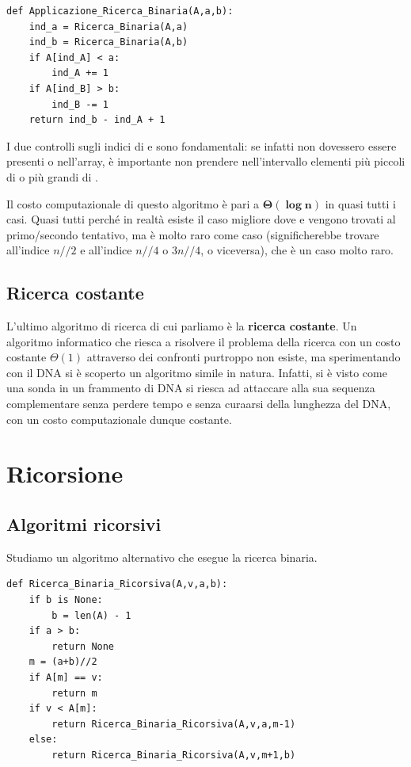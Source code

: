 \documentclass[11pt, a4paper, titlepage, oneside]{scrbook}
\begin{document}
\begin{lstlisting}[style=Python]
def Applicazione_Ricerca_Binaria(A,a,b):
    ind_a = Ricerca_Binaria(A,a)
    ind_b = Ricerca_Binaria(A,b)
    if A[ind_A] < a:
        ind_A += 1
    if A[ind_B] > b:
        ind_B -= 1
    return ind_b - ind_A + 1
\end{lstlisting}

I due controlli sugli indici di  e  sono fondamentali: se infatti non dovessero essere presenti  o  nell'array, è importante non prendere nell'intervallo elementi più piccoli di  o più grandi di .

Il costo computazionale di questo algoritmo è pari a $\bm{\Theta(\log n)}$ in quasi tutti i casi. Quasi tutti perché in realtà esiste il caso migliore dove  e  vengono trovati al primo/secondo tentativo, ma è molto raro come caso (significherebbe trovare  all'indice $n//2$ e  all'indice $n//4$ o $3n//4$, o viceversa), che è un caso molto raro. 

\section{Ricerca costante}

L'ultimo algoritmo di ricerca di cui parliamo è la \textbf{ricerca costante}. Un algoritmo informatico che riesca a risolvere il problema della ricerca con un costo costante $\Theta(1)$ attraverso dei confronti purtroppo non esiste, ma sperimentando con il DNA si è scoperto un algoritmo simile in natura. Infatti, si è visto come una sonda in un frammento di DNA si riesca ad attaccare alla sua sequenza complementare senza perdere tempo e senza curaarsi della lunghezza del DNA, con un costo computazionale dunque costante.

\chapter{Ricorsione}

\section{Algoritmi ricorsivi}

Studiamo un algoritmo alternativo che esegue la ricerca binaria.

\begin{lstlisting}[style=Python]
def Ricerca_Binaria_Ricorsiva(A,v,a,b):
    if b is None:
        b = len(A) - 1
    if a > b:
        return None
    m = (a+b)//2
    if A[m] == v:
        return m
    if v < A[m]:
        return Ricerca_Binaria_Ricorsiva(A,v,a,m-1)
    else:
        return Ricerca_Binaria_Ricorsiva(A,v,m+1,b)
\end{lstlisting}
\end{document}
